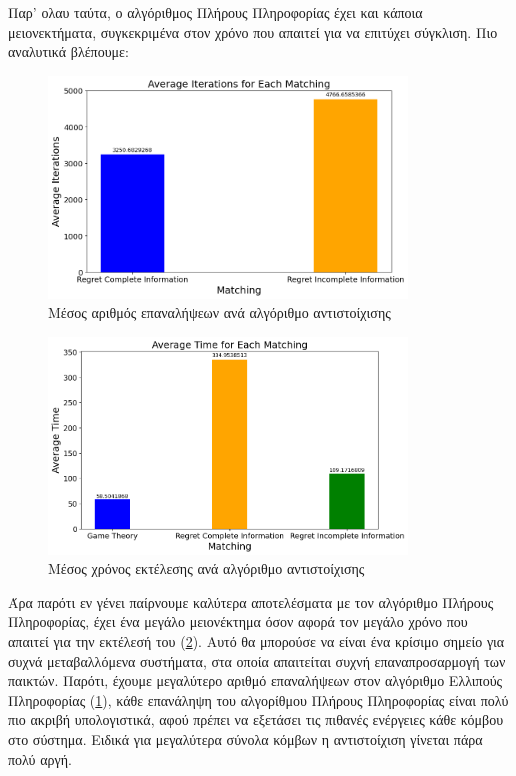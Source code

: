 Παρ' ολαυ ταύτα, ο αλγόριθμος Πλήρους Πληροφορίας έχει και κάποια μειονεκτήματα, συγκεκριμένα στον χρόνο που απαιτεί για να επιτύχει σύγκλιση. Πιο αναλυτικά βλέπουμε:

\begin{figure}[H]
    \centering
    \includegraphics[width=0.85\textwidth]{figures/chapter4/Average_Iterations.png}
    \caption{Μέσος αριθμός επαναλήψεων ανά αλγόριθμο αντιστοίχισης}
    \label{fig29}
\end{figure}

\begin{figure}[H]
    \centering
    \includegraphics[width=0.85\textwidth]{figures/chapter4/Average_Time.png}
    \caption{Μέσος χρόνος εκτέλεσης ανά αλγόριθμο αντιστοίχισης}
    \label{fig30}
\end{figure}

Άρα παρότι εν γένει παίρνουμε καλύτερα αποτελέσματα με τον αλγόριθμο Πλήρους Πληροφορίας, έχει ένα μεγάλο μειονέκτημα όσον αφορά τον μεγάλο χρόνο που απαιτεί για την εκτέλεσή του (\ref{fig30}). Αυτό θα μπορούσε να είναι ένα κρίσιμο σημείο για συχνά μεταβαλλόμενα συστήματα, στα οποία απαιτείται συχνή επαναπροσαρμογή των παικτών. Παρότι, έχουμε μεγαλύτερο αριθμό επαναλήψεων στον αλγόριθμο Ελλιπούς Πληροφορίας (\ref{fig29}), κάθε επανάληψη του αλγορίθμου Πλήρους Πληροφορίας είναι πολύ πιο ακριβή υπολογιστικά, αφού πρέπει να εξετάσει τις πιθανές ενέργειες κάθε κόμβου στο σύστημα. Ειδικά για μεγαλύτερα σύνολα κόμβων η αντιστοίχιση γίνεται πάρα πολύ αργή.


